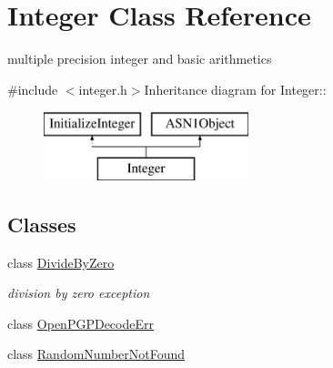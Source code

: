 \hypertarget{class_integer}{
\section{Integer Class Reference}
\label{class_integer}
}


multiple precision integer and basic arithmetics  


{\ttfamily \#include $<$integer.h$>$}Inheritance diagram for Integer::\begin{figure}[H]
\begin{center}
\leavevmode
\includegraphics[height=2cm]{class_integer}
\end{center}
\end{figure}
\subsection*{Classes}
\begin{DoxyCompactItemize}
\item 
class \hyperlink{class_integer_1_1_divide_by_zero}{DivideByZero}
\begin{DoxyCompactList}\small\item\em division by zero exception \item\end{DoxyCompactList}\item 
class \hyperlink{class_integer_1_1_open_p_g_p_decode_err}{OpenPGPDecodeErr}
\item 
class \hyperlink{class_integer_1_1_random_number_not_found}{RandomNumberNotFound}
\end{DoxyCompactItemize}
